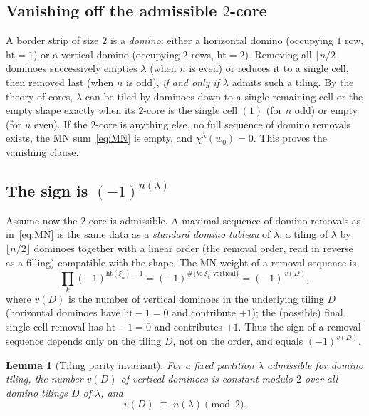 \documentclass[11pt]{article}
\newtheorem{lemma}{Lemma}
\theoremstyle{definition}
\newcommand{\wzero}{w_0}
\begin{document}
\subsection{Vanishing off the admissible $2$-core}

A border strip of size $2$ is a \emph{domino}: either a horizontal domino
(occupying $1$ row, $\mathrm{ht}=1$) or a vertical domino (occupying $2$ rows,
$\mathrm{ht}=2$).  Removing all $\lfloor n/2\rfloor$ dominoes successively
empties $\lambda$ (when $n$ is even) or reduces it to a single cell, then removed
last (when $n$ is odd), \emph{if and only if} $\lambda$ admits such a tiling.  By
the theory of cores, $\lambda$ can be tiled by dominoes down to a single
remaining cell or the empty shape exactly when its $2$-core is the single cell
$(1)$ (for $n$ odd) or empty (for $n$ even).  If the $2$-core is anything else,
no full sequence of domino removals exists, the MN sum~\eqref{eq:MN} is empty,
and $\chi^\lambda(\wzero)=0$.  This proves the vanishing clause.

\subsection{The sign is $(-1)^{n(\lambda)}$}

Assume now the $2$-core is admissible.  A maximal sequence of domino removals as
in~\eqref{eq:MN} is the same data as a \emph{standard domino tableau} of
$\lambda$: a tiling of $\lambda$ by $\lfloor n/2\rfloor$ dominoes together with a
linear order (the removal order, read in reverse as a filling) compatible with
the shape.  The MN weight of a removal sequence is
\[
\prod_k(-1)^{\mathrm{ht}(\xi_k)-1}
=(-1)^{\#\{k:\ \xi_k\text{ vertical}\}}
=(-1)^{\,v(D)},
\]
where $v(D)$ is the number of vertical dominoes in the underlying tiling $D$
(horizontal dominoes have $\mathrm{ht}-1=0$ and contribute $+1$); the (possible)
final single-cell removal has $\mathrm{ht}-1=0$ and contributes $+1$.  Thus the
sign of a removal sequence depends only on the tiling $D$, not on the order, and
equals $(-1)^{v(D)}$.

\begin{lemma}[Tiling parity invariant]\label{lem:parity}
For a fixed partition $\lambda$ admissible for domino tiling, the number $v(D)$
of vertical dominoes is constant modulo $2$ over all domino tilings $D$ of
$\lambda$, and
\[
v(D)\;\equiv\;n(\lambda)\pmod 2 .
\]
\end{lemma}
\end{document}
